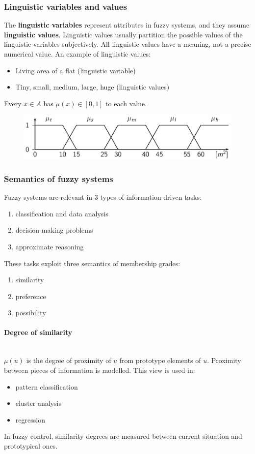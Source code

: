 \documentclass{article}
\begin{document}
\subsubsection{Linguistic variables and values}
The \textbf{linguistic variables} represent attributes in fuzzy systems, and they assume
\textbf{linguistic values}. Linguistic values usually partition the possible values of the
linguistic variables subjectively.
\newline\newline
All linguistic values have a meaning, not a precise numerical value.
An example of linguistic values:
\begin{itemize}
    \item Living area of a flat (linguistic variable)
    \item Tiny, small, medium, large, huge (linguistic values)
\end{itemize}
Every $x\in A$ has $\mu(x)\in [0,1]$ to each value.
\begin{figure}
    \centering
    \includegraphics[scale=0.4]{images/ling_val.png}
\end{figure}
\subsubsection{Semantics of fuzzy systems}
Fuzzy systems are relevant in $3$ types of information-driven
tasks:
\begin{enumerate}
    \item classification and data analysis
    \item decision-making problems
    \item approximate reasoning
\end{enumerate}
These tasks exploit three semantics of membership grades:
\begin{enumerate}
    \item similarity
    \item preference
    \item possibility
\end{enumerate}
\paragraph{Degree of similarity}\mbox{}\\
$\mu(u)$ is the degree of proximity of $u$ from prototype elements of $u$. Proximity between
pieces of information is modelled.
This view is used in:
\begin{itemize}
    \item pattern classification
    \item cluster analysis
    \item regression
\end{itemize}
In fuzzy control, similarity degrees are measured between current situation and prototypical
ones.
\end{document}

